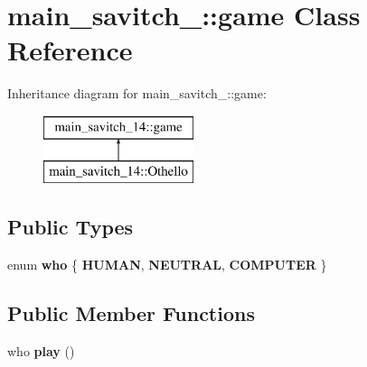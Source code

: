 \hypertarget{classmain__savitch__14_1_1game}{}\section{main\+\_\+savitch\+\_\+:\+:game Class Reference}
\label{classmain__savitch__14_1_1game}
Inheritance diagram for main\+\_\+savitch\+\_\+:\+:game\+:\begin{figure}[H]
\begin{center}
\leavevmode
\includegraphics[height=2.000000cm]{classmain__savitch__14_1_1game}
\end{center}
\end{figure}
\subsection*{Public Types}
\begin{DoxyCompactItemize}
\item 
\mbox{\label{classmain__savitch__14_1_1game_a4fe20fb287f809ae2b68e28e4ccba634}} 
enum {\bfseries who} \{ {\bfseries H\+U\+M\+AN}, 
{\bfseries N\+E\+U\+T\+R\+AL}, 
{\bfseries C\+O\+M\+P\+U\+T\+ER}
 \}
\end{DoxyCompactItemize}
\subsection*{Public Member Functions}
\begin{DoxyCompactItemize}
\item 
\mbox{\label{classmain__savitch__14_1_1game_a4dbeaddb78059f7c5dcbf5cc4e026317}} 
who {\bfseries play} ()
\end{DoxyCompactItemize}

